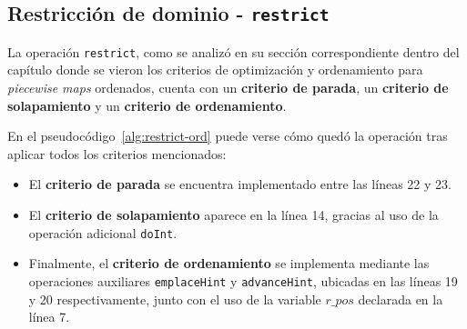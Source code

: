 \subsection{Restricción de dominio - \texttt{restrict}}

La operación \texttt{restrict}, como se analizó en su sección correspondiente dentro del capítulo donde se vieron los criterios de optimización y ordenamiento para \textit{piecewise maps} ordenados, cuenta con un \textbf{criterio de parada}, un \textbf{criterio de solapamiento} y un \textbf{criterio de ordenamiento}.

En el pseudocódigo~\ref{alg:restrict-ord} puede verse cómo quedó la operación tras aplicar todos los criterios mencionados:

\begin{itemize}
    \item El \textbf{criterio de parada} se encuentra implementado entre las líneas 22 y 23.
    
    \item El \textbf{criterio de solapamiento} aparece en la línea 14, gracias al uso de la operación adicional \texttt{doInt}.
    
    \item Finalmente, el \textbf{criterio de ordenamiento} se implementa mediante las operaciones auxiliares \texttt{emplaceHint} y \texttt{advanceHint}, ubicadas en las líneas 19 y 20 respectivamente, junto con el uso de la variable $r\_pos$ declarada en la línea 7.
\end{itemize}


